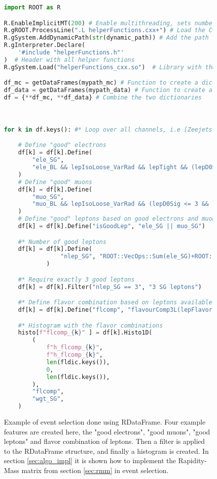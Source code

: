 \begin{figure}[H]
    \centering
\begin{lstlisting}[language=Python, style=pythonstyle, label={code:python_func_example}]
import ROOT as R

R.EnableImplicitMT(200) # Enable multithreading, sets number of threads to 200 or the highest number possible if the number of threads is less than 200     
R.gROOT.ProcessLine(".L helperFunctions.cxx+") # Load the C++ helper functions in ROOT interpreter
R.gSystem.AddDynamicPath(str(dynamic_path)) # Add the path to the library with the helper functions to the ROOT interpreter
R.gInterpreter.Declare(
    '#include "helperFunctions.h"'
)  # Header with all helper functions
R.gSystem.Load("helperFunctions_cxx.so")  # Library with the myFilter function

df_mc = getDataFrames(mypath_mc) # Function to create a dictionary of RDataFrames for each channel in the SM MC and possible signal samples
df_data = getDataFrames(mypath_data) # Function to create a dictionary of RDataFrames for ATLAS data
df = {**df_mc, **df_data} # Combine the two dictionaries



for k in df.keys(): #* Loop over all channels, i.e [Zeejets, ttbar, data15, ...]

    # Define "good" electrons
    df[k] = df[k].Define(
        "ele_SG",
        "ele_BL && lepIsoLoose_VarRad && lepTight && (lepD0Sig <= 5 && lepD0Sig >= -5)",
    ) 
    # Define "good" muons 
    df[k] = df[k].Define(
        "muo_SG",
        "muo_BL && lepIsoLoose_VarRad && (lepD0Sig <= 3 && lepD0Sig >= -3)",
    )  
    # Define "good" leptons based on good electrons and muons
    df[k] = df[k].Define("isGoodLep", "ele_SG || muo_SG")

    #* Number of good leptons
    df[k] = df[k].Define(
                "nlep_SG", "ROOT::VecOps::Sum(ele_SG)+ROOT::VecOps::Sum(muo_SG)"
            )

    #* Require exactly 3 good leptons
    df[k] = df[k].Filter("nlep_SG == 3", "3 SG leptons")

    #* Define flavor combination based on leptons available
    df[k] = df[k].Define("flcomp", "flavourComp3L(lepFlavor[ele_SG || muo_SG])")

    #* Histogram with the flavor combinations
    histo[f"flcomp_{k}" ] = df[k].Histo1D(
        (
            f"h_flcomp_{k}",
            f"h_flcomp_{k}",
            len(fldic.keys()),
            0,
            len(fldic.keys()),
        ),
        "flcomp",
        "wgt_SG",
    )
    \end{lstlisting}
    \caption[RDataFrame code example]{Example of event selection done using RDataFrame. Four example features are created here, the "good electrons", "good muons",
    "good leptons" and flavor combination of leptons. Then a filter is applied to the RDataFrame structure, and finally a histogram is created. In section \ref{sec:algo_impl}
    it is shown how to implement the Rapidity-Mass matrix from section \ref{sec:rmm} in event selection.}
    \label{code:rdata}
\end{figure}

